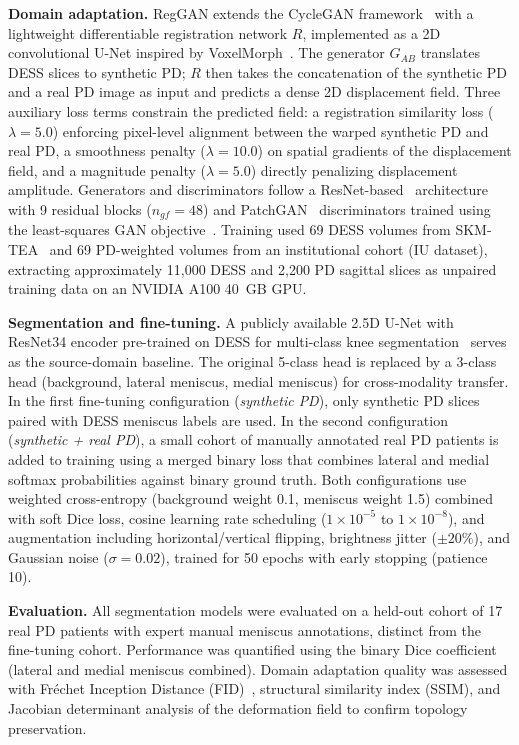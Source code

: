 \documentclass[12pt, a4paper]{article}
\begin{document}
\textbf{Domain adaptation.}
RegGAN extends the CycleGAN framework~\cite{zhu2017cyclegan} with a lightweight differentiable registration network $R$, implemented as a 2D convolutional U-Net inspired by VoxelMorph~\cite{balakrishnan2019voxelmorph}. The generator $G_{AB}$ translates DESS slices to synthetic PD; $R$ then takes the concatenation of the synthetic PD and a real PD image as input and predicts a dense 2D displacement field. Three auxiliary loss terms constrain the predicted field: a registration similarity loss ($\lambda=5.0$) enforcing pixel-level alignment between the warped synthetic PD and real PD, a smoothness penalty ($\lambda=10.0$) on spatial gradients of the displacement field, and a magnitude penalty ($\lambda=5.0$) directly penalizing displacement amplitude. Generators and discriminators follow a ResNet-based~\cite{he2016resnet} architecture with 9 residual blocks ($n_{gf}=48$) and PatchGAN~\cite{isola2017pix2pix} discriminators trained using the least-squares GAN objective~\cite{mao2017lsgan}. Training used 69 DESS volumes from SKM-TEA~\cite{desai2022skmtea} and 69 PD-weighted volumes from an institutional cohort (IU dataset), extracting approximately 11{,}000 DESS and 2{,}200 PD sagittal slices as unpaired training data on an NVIDIA A100 40~GB GPU.

\textbf{Segmentation and fine-tuning.}
A publicly available 2.5D U-Net with ResNet34 encoder pre-trained on DESS for multi-class knee segmentation~\cite{desai2021akoa} serves as the source-domain baseline. The original 5-class head is replaced by a 3-class head (background, lateral meniscus, medial meniscus) for cross-modality transfer. In the first fine-tuning configuration (\textit{synthetic PD}), only synthetic PD slices paired with DESS meniscus labels are used. In the second configuration (\textit{synthetic + real PD}), a small cohort of manually annotated real PD patients is added to training using a merged binary loss that combines lateral and medial softmax probabilities against binary ground truth. Both configurations use weighted cross-entropy (background weight 0.1, meniscus weight 1.5) combined with soft Dice loss, cosine learning rate scheduling ($1\times10^{-5}$ to $1\times10^{-8}$), and augmentation including horizontal/vertical flipping, brightness jitter ($\pm20\%$), and Gaussian noise ($\sigma=0.02$), trained for 50 epochs with early stopping (patience 10).

\textbf{Evaluation.}
All segmentation models were evaluated on a held-out cohort of 17 real PD patients with expert manual meniscus annotations, distinct from the fine-tuning cohort. Performance was quantified using the binary Dice coefficient (lateral and medial meniscus combined). Domain adaptation quality was assessed with Fr\'{e}chet Inception Distance (FID)~\cite{heusel2017fid}, structural similarity index (SSIM), and Jacobian determinant analysis of the deformation field to confirm topology preservation.
\end{document}
